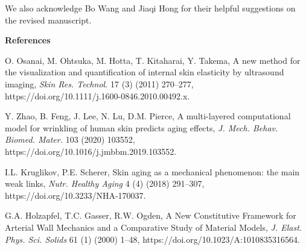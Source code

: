 \documentclass[11pt]{article}
\begin{document}
\noindent
We also acknowledge Bo Wang and Jiaqi Hong for their helpful
suggestions on the revised manuscript.

\vspace{0.5em}

\noindent\textbf{References}

\vspace{0.3em}

\begin{list}{}{%
  \setlength{\leftmargin}{2em}%
  \setlength{\itemindent}{-2em}%
  \setlength{\itemsep}{0.5em}%
  \setlength{\parsep}{0pt}%
}

\item [1] O. Osanai, M. Ohtsuka, M. Hotta, T. Kitaharai, Y.
Takema, A new method for the visualization and quantification
of internal skin elasticity by ultrasound imaging,
\emph{Skin Res. Technol.} 17 (3) (2011) 270--277,
https://doi.org/10.1111/j.1600-0846.2010.00492.x.

\item [2] Y. Zhao, B. Feng, J. Lee, N. Lu, D.M. Pierce, A
multi-layered computational model for wrinkling of human skin
predicts aging effects, \emph{J. Mech. Behav. Biomed. Mater.}
103 (2020) 103552, https://doi.org/10.1016/j.jmbbm.2019.103552.

\item [3] I.L. Kruglikov, P.E. Scherer, Skin aging as a
mechanical phenomenon: the main weak links, \emph{Nutr. Healthy
Aging} 4 (4) (2018) 291--307,
https://doi.org/10.3233/NHA-170037.

\item [4] G.A. Holzapfel, T.C. Gasser, R.W. Ogden, A New
Constitutive Framework for Arterial Wall Mechanics and a
Comparative Study of Material Models, \emph{J. Elast. Phys.
Sci. Solids} 61 (1) (2000) 1--48,
https://doi.org/10.1023/A:1010835316564.

\end{list}


\newpage

\end{document}
